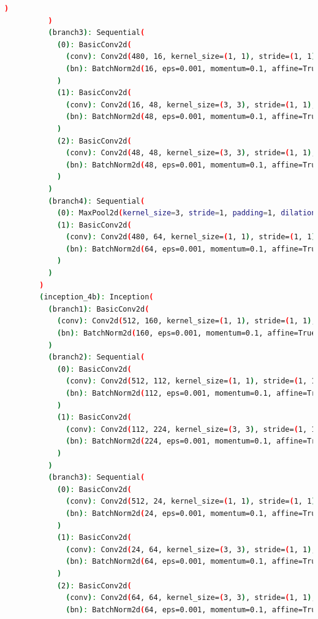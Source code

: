 \documentclass[a4paper, 12pt]{article}
\begin{document}
\begin{lstlisting}[language=sh]
            )
          )
          (branch3): Sequential(
            (0): BasicConv2d(
              (conv): Conv2d(480, 16, kernel_size=(1, 1), stride=(1, 1), bias=False)
              (bn): BatchNorm2d(16, eps=0.001, momentum=0.1, affine=True, track_running_stats=True)
            )
            (1): BasicConv2d(
              (conv): Conv2d(16, 48, kernel_size=(3, 3), stride=(1, 1), padding=(1, 1), bias=False)
              (bn): BatchNorm2d(48, eps=0.001, momentum=0.1, affine=True, track_running_stats=True)
            )
            (2): BasicConv2d(
              (conv): Conv2d(48, 48, kernel_size=(3, 3), stride=(1, 1), padding=(1, 1), bias=False)
              (bn): BatchNorm2d(48, eps=0.001, momentum=0.1, affine=True, track_running_stats=True)
            )
          )
          (branch4): Sequential(
            (0): MaxPool2d(kernel_size=3, stride=1, padding=1, dilation=1, ceil_mode=False)
            (1): BasicConv2d(
              (conv): Conv2d(480, 64, kernel_size=(1, 1), stride=(1, 1), bias=False)
              (bn): BatchNorm2d(64, eps=0.001, momentum=0.1, affine=True, track_running_stats=True)
            )
          )
        )
        (inception_4b): Inception(
          (branch1): BasicConv2d(
            (conv): Conv2d(512, 160, kernel_size=(1, 1), stride=(1, 1), bias=False)
            (bn): BatchNorm2d(160, eps=0.001, momentum=0.1, affine=True, track_running_stats=True)
          )
          (branch2): Sequential(
            (0): BasicConv2d(
              (conv): Conv2d(512, 112, kernel_size=(1, 1), stride=(1, 1), bias=False)
              (bn): BatchNorm2d(112, eps=0.001, momentum=0.1, affine=True, track_running_stats=True)
            )
            (1): BasicConv2d(
              (conv): Conv2d(112, 224, kernel_size=(3, 3), stride=(1, 1), padding=(1, 1), bias=False)
              (bn): BatchNorm2d(224, eps=0.001, momentum=0.1, affine=True, track_running_stats=True)
            )
          )
          (branch3): Sequential(
            (0): BasicConv2d(
              (conv): Conv2d(512, 24, kernel_size=(1, 1), stride=(1, 1), bias=False)
              (bn): BatchNorm2d(24, eps=0.001, momentum=0.1, affine=True, track_running_stats=True)
            )
            (1): BasicConv2d(
              (conv): Conv2d(24, 64, kernel_size=(3, 3), stride=(1, 1), padding=(1, 1), bias=False)
              (bn): BatchNorm2d(64, eps=0.001, momentum=0.1, affine=True, track_running_stats=True)
            )
            (2): BasicConv2d(
              (conv): Conv2d(64, 64, kernel_size=(3, 3), stride=(1, 1), padding=(1, 1), bias=False)
              (bn): BatchNorm2d(64, eps=0.001, momentum=0.1, affine=True, track_running_stats=True)

\end{lstlisting}
\end{document}
